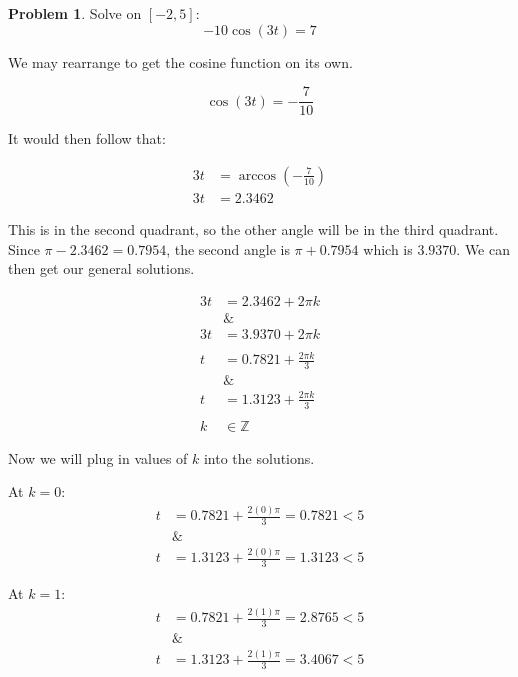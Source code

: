 \documentclass[12pt]{article}
\theoremstyle{definition}
\newtheorem{problem}{Problem}
\begin{document}
\begin{problem}
Solve on $[-2, 5]$:
\begin{equation*}
    -10\cos(3t) = 7 \label{eq:7}
\end{equation*}
\end{problem}

We may rearrange to get the cosine function on its own.

\begin{equation}
    \cos(3t) = -\frac{7}{10}
\end{equation}

It would then follow that:

\begin{align}
    3t & = \arccos\left(-\frac{7}{10}\right) \\
    3t & = 2.3462
\end{align}

This is in the second quadrant, so the other angle will be in the third quadrant.
Since $\pi - 2.3462 = 0.7954$, the second angle is $\pi + 0.7954$ which is $3.9370$.
We can then get our general solutions.

\begin{align}
    3t        & = 2.3462 + 2\pi k           \\
    \nonumber & \&                          \\
    3t        & = 3.9370 + 2\pi k           \\
    \nonumber                               \\
    t         & = 0.7821 + \frac{2\pi k}{3} \\
    \nonumber & \&                          \\
    t         & = 1.3123 + \frac{2\pi k}{3} \\
    \nonumber                               \\
    k         & \in \mathbb{Z}
\end{align}

Now we will plug in values of $k$ into the solutions.

At $k=0$:
\begin{align}
    t         & = 0.7821 + \frac{2(0)\pi}{3} = 0.7821 < 5 \\
    \nonumber & \&                                        \\
    t         & = 1.3123 + \frac{2(0)\pi}{3} = 1.3123 < 5
\end{align}

At $k=1$:
\begin{align}
    t         & = 0.7821 + \frac{2(1)\pi}{3} = 2.8765 < 5 \\
    \nonumber & \&                                        \\
    t         & = 1.3123 + \frac{2(1)\pi}{3} = 3.4067 < 5
\end{align}
\end{document}
